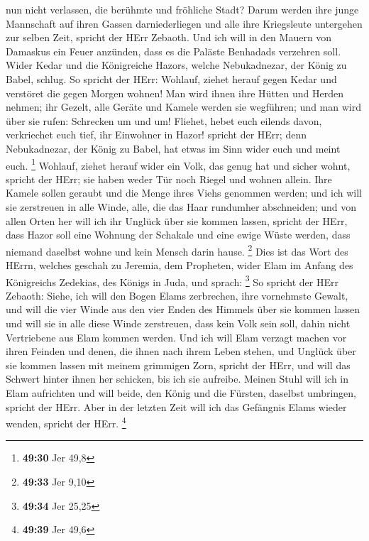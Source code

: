nun nicht verlassen, die berühmte und fröhliche Stadt? 
Darum werden ihre junge Mannschaft auf ihren Gassen darniederliegen und
alle ihre Kriegsleute untergehen zur selben Zeit, spricht der HErr
Zebaoth.  Und ich will in den Mauern von Damaskus ein Feuer
anzünden, dass es die Paläste Benhadads verzehren soll. 
Wider Kedar und die Königreiche Hazors, welche Nebukadnezar, der König
zu Babel, schlug. So spricht der HErr: Wohlauf, ziehet herauf gegen
Kedar und verstöret die gegen Morgen wohnen!  Man wird
ihnen ihre Hütten und Herden nehmen; ihr Gezelt, alle Geräte und Kamele
werden sie wegführen; und man wird über sie rufen: Schrecken um und um!
 Fliehet, hebet euch eilends davon, verkriechet euch tief,
ihr Einwohner in Hazor! spricht der HErr; denn Nebukadnezar, der König
zu Babel, hat etwas im Sinn wider euch und meint euch. \footnote{\textbf{49:30}
  Jer 49,8}  Wohlauf, ziehet herauf wider ein Volk, das
genug hat und sicher wohnt, spricht der HErr; sie haben weder Tür noch
Riegel und wohnen allein.  Ihre Kamele sollen geraubt und
die Menge ihres Viehs genommen werden; und ich will sie zerstreuen in
alle Winde, alle, die das Haar rundumher abschneiden; und von allen
Orten her will ich ihr Unglück über sie kommen lassen, spricht der HErr,
 dass Hazor soll eine Wohnung der Schakale und eine ewige
Wüste werden, dass niemand daselbst wohne und kein Mensch darin hause.
\footnote{\textbf{49:33} Jer 9,10}  Dies ist das Wort des
HErrn, welches geschah zu Jeremia, dem Propheten, wider Elam im Anfang
des Königreichs Zedekias, des Königs in Juda, und sprach: \footnote{\textbf{49:34}
  Jer 25,25}  So spricht der HErr Zebaoth: Siehe, ich will
den Bogen Elams zerbrechen, ihre vornehmste Gewalt,  und
will die vier Winde aus den vier Enden des Himmels über sie kommen
lassen und will sie in alle diese Winde zerstreuen, dass kein Volk sein
soll, dahin nicht Vertriebene aus Elam kommen werden.  Und
ich will Elam verzagt machen vor ihren Feinden und denen, die ihnen nach
ihrem Leben stehen, und Unglück über sie kommen lassen mit meinem
grimmigen Zorn, spricht der HErr, und will das Schwert hinter ihnen her
schicken, bis ich sie aufreibe.  Meinen Stuhl will ich in
Elam aufrichten und will beide, den König und die Fürsten, daselbst
umbringen, spricht der HErr.  Aber in der letzten Zeit will
ich das Gefängnis Elams wieder wenden, spricht der HErr. \footnote{\textbf{49:39}
  Jer 49,6}

